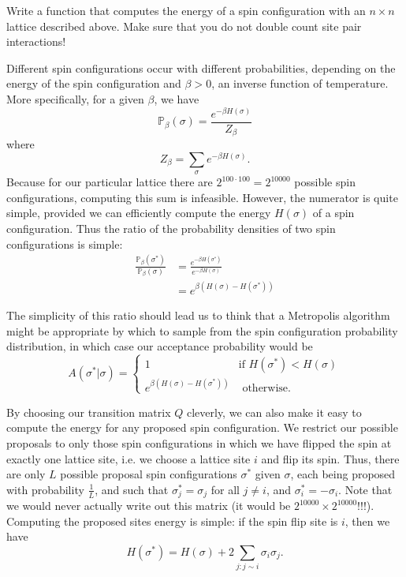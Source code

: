\begin{problem}
Write a function that computes the energy of a spin configuration with an $n \times n$ lattice described above. Make sure that you do not double count site pair interactions!
\end{problem}

Different spin configurations occur with different probabilities, depending on the energy of the spin configuration and $\beta > 0$, an inverse function of temperature. More specifically, for a given $\beta$, we have $$\mathbb{P}_{\beta}(\sigma) = \frac{e^{-\beta H(\sigma)}}{Z_{\beta}}$$ where $$Z_{\beta} = \sum_{\sigma} e^{-\beta H(\sigma)}.$$ Because for our particular lattice there are $2^{100 \cdot 100} = 2^{10000}$ possible spin configurations, computing this sum is infeasible. However, the numerator is quite simple, provided we can efficiently compute the energy $H(\sigma)$ of a spin configuration. Thus the ratio of the probability densities of two spin configurations is simple: 
\begin{align*}
\frac{\mathbb{P}_{\beta}(\sigma^{*})}{\mathbb{P}_{\beta}(\sigma)} & = \frac{e^{-\beta H(\sigma^{*})}}{e^{-\beta H(\sigma)}} \\
& = e^{\beta (H(\sigma) - H(\sigma^{*}))}
\end{align*}

The simplicity of this ratio should lead us to think that a Metropolis algorithm might be appropriate by which to sample from the spin configuration probability distribution, in which case our acceptance probability would be $$A(\sigma^{*} | \sigma) = \begin{cases} 1 & \mbox{if } H(\sigma^{*}) < H(\sigma) \\ e^{\beta (H(\sigma) - H(\sigma^{*}))} & \mbox{ otherwise.} \end{cases}$$

By choosing our transition matrix $Q$ cleverly, we can also make it easy to compute the energy for any proposed spin configuration. We restrict our possible proposals to only those spin configurations in which we have flipped the spin at exactly one lattice site, i.e. we choose a lattice site $i$ and flip its spin. Thus, there are only $L$ possible proposal spin configurations $\sigma^{*}$ given $\sigma$, each being proposed with probability $\frac{1}{L}$, and such that $\sigma_{j}^{*} = \sigma_{j}$ for all $j \neq i$, and $\sigma_{i}^{*} = - \sigma_{i}$. Note that we would never actually write out this matrix (it would be $2^{10000} \times 2^{10000}$!!!). Computing the proposed sites energy is simple: if the spin flip site is $i$, then we have $$H(\sigma^{*}) = H(\sigma) + 2\sum_{j: j \sim i} \sigma_{i}\sigma_{j}.$$

